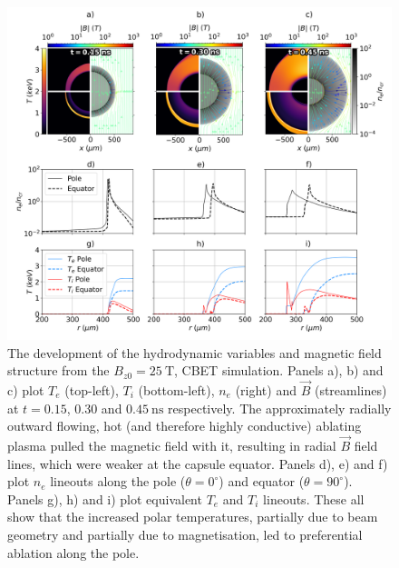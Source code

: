 \begin{figure}[t!]
    \includegraphics[width=\linewidth]{Results2/Images/mag_early_B_develop.png}
    \centering
    \caption{The development of the hydrodynamic variables and magnetic field structure from the $B_{z0}=25\ \text{T}$, \ac{CBET} simulation.
    Panels a), b) and c) plot $T_e$ (top-left), $T_i$ (bottom-left), $n_e$ (right) and $\vec{B}$ (streamlines) at $t=0.15$, $0.30$ and $0.45\ \text{ns}$ respectively.
    The approximately radially outward flowing, hot (and therefore highly conductive) ablating plasma pulled the magnetic field with it, resulting in radial $\vec{B}$ field lines, which were weaker at the capsule equator.
    Panels d), e) and f) plot $n_e$ lineouts along the pole ($\theta=0^{\circ}$) and equator ($\theta=90^{\circ}$).
    Panels g), h) and i) plot equivalent $T_e$ and $T_i$ lineouts.
    These all show that the increased polar temperatures, partially due to beam geometry and partially due to magnetisation, led to preferential ablation along the pole.}%
    \label{fig:Res2_mag_early_B_develop}
\end{figure}

